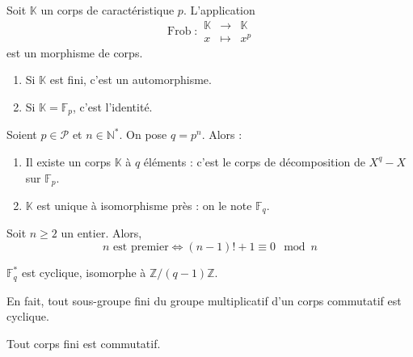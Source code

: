   \begin{proposition}
    Soit $\mathbb{K}$ un corps de caractéristique $p$. L'application
    \[
      \operatorname{Frob} :
      \begin{array}{ccc}
        \mathbb{K} &\rightarrow& \mathbb{K} \\
        x &\mapsto& x^p
      \end{array}
    \]
    est un morphisme de corps.
    \begin{enumerate}[label={\bfseries(\roman*)}]
      \item Si $\mathbb{K}$ est fini, c'est un automorphisme.
      \item Si $\mathbb{K} = \mathbb{F}_p$, c'est l'identité.
    \end{enumerate}
  \end{proposition}

  \begin{theorem}
    Soient $p \in \mathcal{P}$ et $n \in \mathbb{N}^*$. On pose $q = p^n$. Alors :
    \begin{enumerate}[label={\bfseries(\roman*)}]
      \item Il existe un corps $\mathbb{K}$ à $q$ éléments : c'est le corps de décomposition de $X^q - X$ sur $\mathbb{F}_p$.
      \item $\mathbb{K}$ est unique à isomorphisme près : on le note $\mathbb{F}_q$.
    \end{enumerate}
  \end{theorem}

  \begin{corollary}
    Soit $n \geq 2$ un entier. Alors,
    \[ n \text{ est premier} \iff (n-1)!+1 \equiv 0 \mod n \]
  \end{corollary}


  \begin{theorem}
    $\mathbb{F}_q^*$ est cyclique, isomorphe à $\mathbb{Z}/(q-1)\mathbb{Z}$.
  \end{theorem}

  \begin{remark}
    En fait, tout sous-groupe fini du groupe multiplicatif d'un corps commutatif est cyclique.
  \end{remark}


  \begin{theorem}
    Tout corps fini est commutatif.
  \end{theorem}


